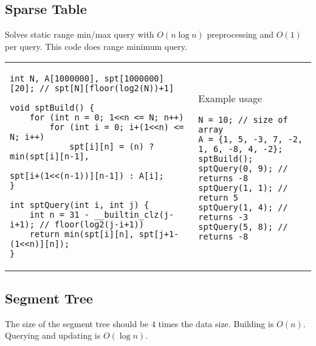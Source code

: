 \documentclass[letterpaper]{article}
\begin{document}
\subsection{Sparse Table}

Solves static range min/max query with $O\left(n\log n\right)$ preprocessing and $O\left(1\right)$ per query. This code does range minimum query.

\begin{tabular}{@{}p{12cm}p{6cm}@{}}
    \vspace*{-1em}
    \begin{lstlisting}
int N, A[1000000], spt[1000000][20]; // spt[N][floor(log2(N))+1]

void sptBuild() {
	for (int n = 0; 1<<n <= N; n++)
		for (int i = 0; i+(1<<n) <= N; i++)
			spt[i][n] = (n) ? min(spt[i][n-1],
			                      spt[i+(1<<(n-1))][n-1]) : A[i];
}

int sptQuery(int i, int j) {
	int n = 31 - __builtin_clz(j-i+1); // floor(log2(j-i+1))
	return min(spt[i][n], spt[j+1-(1<<n)][n]);
}
\end{lstlisting}
     &
    Example usage
    \begin{lstlisting}
N = 10; // size of array
A = {1, 5, -3, 7, -2, 1, 6, -8, 4, -2};
sptBuild();
sptQuery(0, 9); // returns -8
sptQuery(1, 1); // return 5
sptQuery(1, 4); // returns -3
sptQuery(5, 8); // returns -8
\end{lstlisting}
\end{tabular}

\clearpage

\subsection{Segment Tree}

The size of the segment tree should be 4 times the data size. Building is $O\left(n\right)$. Querying and updating is $O\left(\log n\right)$.
\end{document}

